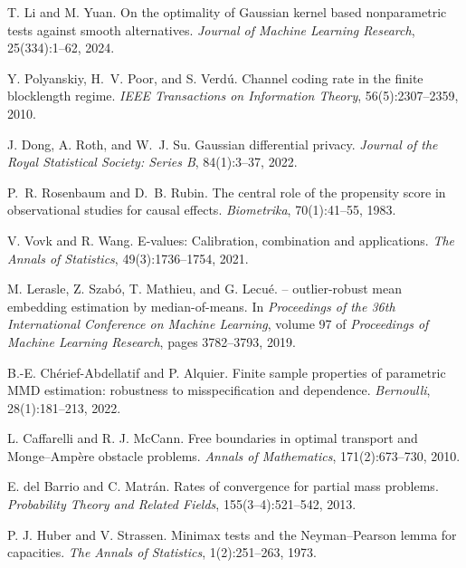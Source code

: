 T. Li and M. Yuan.
\newblock On the optimality of {G}aussian kernel based nonparametric tests against smooth alternatives.
\newblock \emph{Journal of Machine Learning Research}, 25(334):1--62, 2024.

Y. Polyanskiy, H.~V. Poor, and S. Verd{\'u}.
\newblock Channel coding rate in the finite blocklength regime.
\newblock \emph{IEEE Transactions on Information Theory}, 56(5):2307--2359, 2010.

J. Dong, A. Roth, and W.~J. Su.
\newblock Gaussian differential privacy.
\newblock \emph{Journal of the Royal Statistical Society: Series B}, 84(1):3--37, 2022.

P.~R. Rosenbaum and D.~B. Rubin.
\newblock The central role of the propensity score in observational studies for causal effects.
\newblock \emph{Biometrika}, 70(1):41--55, 1983.

V. Vovk and R. Wang.
\newblock E-values: Calibration, combination and applications.
\newblock \emph{The Annals of Statistics}, 49(3):1736--1754, 2021.

M. Lerasle, Z. Szab{\'o}, T. Mathieu, and G. Lecu{\'e}.
 -- outlier-robust mean embedding estimation by median-of-means.
\newblock In \emph{Proceedings of the 36th International Conference on Machine Learning}, volume 97 of \emph{Proceedings of Machine Learning Research}, pages 3782--3793, 2019.

B.-E. Ch{\'e}rief-Abdellatif and P. Alquier.
\newblock Finite sample properties of parametric {MMD} estimation: robustness to misspecification and dependence.
\newblock \emph{Bernoulli}, 28(1):181--213, 2022.

L. Caffarelli and R. J. McCann.
\newblock Free boundaries in optimal transport and {M}onge--{A}mp{\`e}re obstacle problems.
\newblock \emph{Annals of Mathematics}, 171(2):673--730, 2010.

E. del Barrio and C. Matr{\'a}n.
\newblock Rates of convergence for partial mass problems.
\newblock \emph{Probability Theory and Related Fields}, 155(3--4):521--542, 2013.

P. J. Huber and V. Strassen.
\newblock Minimax tests and the {N}eyman--{P}earson lemma for capacities.
\newblock \emph{The Annals of Statistics}, 1(2):251--263, 1973.


